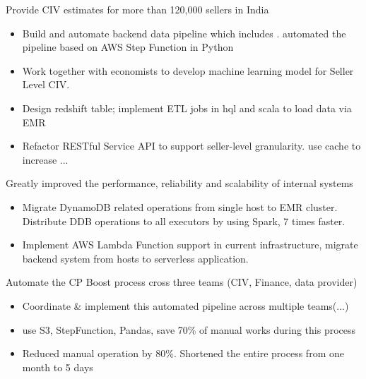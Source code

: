\documentclass[10pt,a4paper,ragged2e,withhyper]{altacv}
\begin{document}
\begin{paracol}{2}


   {Provide CIV estimates for more than 120,000 sellers in India}
  \begin{itemize}
    \item Build and automate backend data pipeline which includes . automated the pipeline based on AWS Step Function in Python
    \item Work together with economists to develop machine learning model for Seller Level CIV.
    \item Design redshift table; implement ETL jobs in hql and scala to load data via EMR
    \item Refactor RESTful Service API to support seller-level granularity. use cache to increase ...
  \end{itemize}

   {Greatly improved the performance, reliability and scalability of internal systems}
  \begin{itemize}
    \item Migrate DynamoDB related operations from single host to EMR cluster. Distribute DDB operations to all executors by using Spark, 7 times faster.
    \item Implement AWS Lambda Function support in current infrastructure, migrate backend system from hosts to serverless application.
  \end{itemize}

   {Automate the CP Boost process cross three teams (CIV, Finance, data provider)}
  \begin{itemize}
    \item Coordinate \& implement this automated pipeline across multiple teams(...)
    \item use S3, StepFunction, Pandas, save 70\% of manual works during this process
    \item Reduced manual operation by 80\%. Shortened the entire process from one month to 5 days
  \end{itemize}


\end{paracol}
\end{document}

